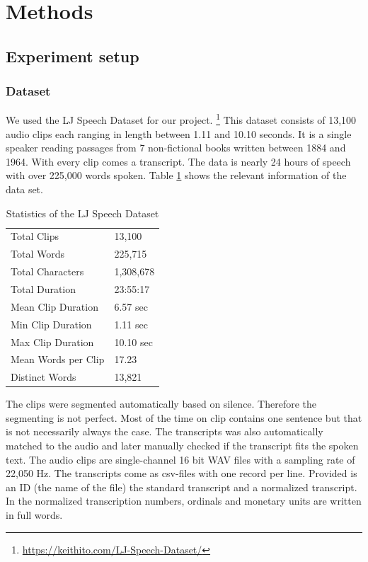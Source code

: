 \documentclass[11pt]{article}
\begin{document}
\section{Methods}\label{sec:methods}

\subsection{Experiment setup}

\subsubsection*{Dataset}

We used the LJ Speech Dataset for our project.%
\footnote{\url{https://keithito.com/LJ-Speech-Dataset/}}
This dataset consists of 13,100 audio clips each ranging in length between 1.11 and 10.10 seconds. It is a single speaker reading passages from 7 non-fictional books written between 1884 and 1964. With every clip comes a transcript. The data is nearly 24 hours of speech with over 225,000 words spoken. Table \ref{t:dataset} shows the relevant information of the data set.
\begin{table}
\centering
\begin{tabular}{ll}
  Total Clips & 13,100\\
  Total Words & 225,715 \\
  Total Characters & 1,308,678\\
  Total Duration & 23:55:17\\
  Mean Clip Duration  & 6.57 sec\\
  Min Clip Duration &	1.11 sec\\
  Max Clip Duration &	10.10 sec\\
  Mean Words per Clip & 17.23\\
  Distinct Words & 13,821\\
\end{tabular}
\caption{Statistics of the LJ Speech Dataset}
\label{t:dataset}
\end{table}

The clips were segmented automatically based on silence. Therefore the segmenting is not perfect. Most of the time on clip contains one sentence but that is not necessarily always the case. The transcripts was also automatically matched to the audio and later manually checked if the transcript fits the spoken text.
The audio clips are single-channel 16 bit WAV files with a sampling rate of 22,050 Hz. The transcripts come as csv-files with one record per line. Provided is an ID (the name of the file) the standard transcript and a normalized transcript. In the normalized transcription numbers, ordinals and monetary units are written in full words. \\
\end{document}
